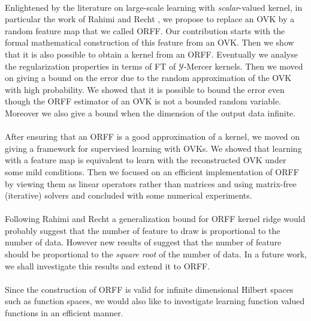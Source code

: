 \documentclass[twoside,11pt]{article}
\begin{document}
\paragraph{}
Enlightened by the literature on large-scale learning with
\emph{scalar}-valued kernel, in particular the work of Rahimi and Recht
\citep{Rahimi2007}, we propose to replace an \acs{OVK} by a random feature
map that we called \acl{ORFF}. Our contribution starts with the formal
mathematical construction of this feature from an \acs{OVK}. Then we show
that it is also possible to obtain a kernel from an \acs{ORFF}. Eventually
we analyse the regularization properties in terms of \acl{FT} of
$\mathcal{Y}$-Mercer kernels. Then we moved on giving a bound on the error
due to the random approximation of the \acs{OVK} with high probability.
We showed that it is possible to bound the error even though the \acs{ORFF}
estimator of an \acs{OVK} is not a bounded random variable. Moreover we
also give a bound when the dimension of the output data infinite.
\paragraph{}
After ensuring that an \acs{ORFF} is a good approximation of a kernel, we
moved on giving a framework for supervised learning with \aclp{OVK}. We showed
that learning with a feature map is equivalent to learn with the reconstructed
\acs{OVK} under some mild conditions. Then we focused on an efficient
implementation of \acs{ORFF} by viewing them as linear operators rather than
matrices and using matrix-free (iterative) solvers and concluded with some
numerical experiments.
\paragraph{}
Following Rahimi and Recht a generalization bound for \acs{ORFF} kernel ridge
would probably suggest that the number of feature to draw is proportional to
the number of data.  However new results of \citet{rudi2016generalization}
suggest that the number of feature should be proportional to the \emph{square
root} of the number of data. In a future work, we shall investigate this
results and extend it to \acs{ORFF}.
\paragraph{}
Since the construction of \acs{ORFF} is valid for infinite dimensional Hilbert
spaces such as function spaces, we would also like to investigate learning
function valued functions in an efficient manner.




\appendix



\end{document}
